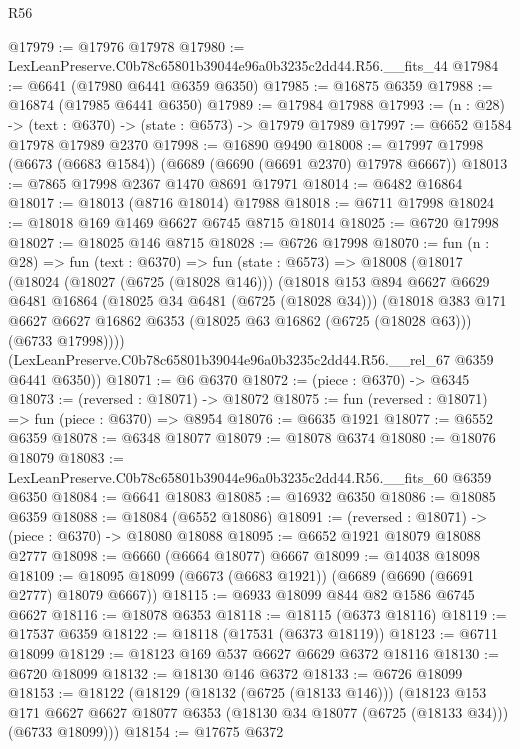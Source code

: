 \begin{lexlean}{R56}
\begin{coremodule}
@17979 := @17976 @17978
@17980 := LexLeanPreserve.C0b78c65801b39044e96a0b3235c2dd44.R56.__fits_44
@17984 := @6641 (@17980 @6441 @6359 @6350)
@17985 := @16875 @6359
@17988 := @16874 (@17985 @6441 @6350)
@17989 := @17984 @17988
@17993 := (n : @28) -> (text : @6370) -> (state : @6573) -> @17979 @17989
@17997 := @6652 @1584 @17978 @17989 @2370
@17998 := @16890 @9490
@18008 := @17997 @17998 (@6673 (@6683 @1584)) (@6689 (@6690 (@6691 @2370) @17978 @6667))
@18013 := @7865 @17998 @2367 @1470 @8691 @17971
@18014 := @6482 @16864
@18017 := @18013 (@8716 @18014) @17988
@18018 := @6711 @17998
@18024 := @18018 @169 @1469 @6627 @6745 @8715 @18014
@18025 := @6720 @17998
@18027 := @18025 @146 @8715
@18028 := @6726 @17998
@18070 := fun (n : @28) =>
  fun (text : @6370) =>
  fun (state : @6573) =>
  @18008
    (@18017
      (@18024
        (@18027 (@6725 (@18028 @146)))
        (@18018
          @153
          @894
          @6627
          @6629
          @6481
          @16864
          (@18025 @34 @6481 (@6725 (@18028 @34)))
          (@18018
            @383
            @171
            @6627
            @6627
            @16862
            @6353
            (@18025 @63 @16862 (@6725 (@18028 @63)))
            (@6733 @17998))))
      (LexLeanPreserve.C0b78c65801b39044e96a0b3235c2dd44.R56.__rel_67 @6359 @6441 @6350))
@18071 := @6 @6370
@18072 := (piece : @6370) -> @6345
@18073 := (reversed : @18071) -> @18072
@18075 := fun (reversed : @18071) => fun (piece : @6370) => @8954
@18076 := @6635 @1921
@18077 := @6552 @6359
@18078 := @6348 @18077
@18079 := @18078 @6374
@18080 := @18076 @18079
@18083 := LexLeanPreserve.C0b78c65801b39044e96a0b3235c2dd44.R56.__fits_60 @6359 @6350
@18084 := @6641 @18083
@18085 := @16932 @6350
@18086 := @18085 @6359
@18088 := @18084 (@6552 @18086)
@18091 := (reversed : @18071) -> (piece : @6370) -> @18080 @18088
@18095 := @6652 @1921 @18079 @18088 @2777
@18098 := @6660 (@6664 @18077) @6667
@18099 := @14038 @18098
@18109 := @18095 @18099 (@6673 (@6683 @1921)) (@6689 (@6690 (@6691 @2777) @18079 @6667))
@18115 := @6933 @18099 @844 @82 @1586 @6745 @6627
@18116 := @18078 @6353
@18118 := @18115 (@6373 @18116)
@18119 := @17537 @6359
@18122 := @18118 (@17531 (@6373 @18119))
@18123 := @6711 @18099
@18129 := @18123 @169 @537 @6627 @6629 @6372 @18116
@18130 := @6720 @18099
@18132 := @18130 @146 @6372
@18133 := @6726 @18099
@18153 := @18122
    (@18129
      (@18132 (@6725 (@18133 @146)))
      (@18123
        @153
        @171
        @6627
        @6627
        @18077
        @6353
        (@18130 @34 @18077 (@6725 (@18133 @34)))
        (@6733 @18099)))
@18154 := @17675 @6372

\end{coremodule}
\end{lexlean}
